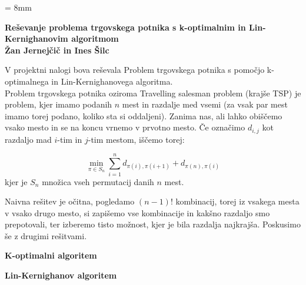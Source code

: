 \documentclass[a4paper,12pt]{article}
\begin{document}
\parindent = 8mm
\begin{center}
\textbf{Reševanje problema trgovskega potnika s k-optimalnim in Lin-Kernighanovim algoritmom}\\
\vspace{5 mm}
\textbf{Žan Jernejčič in Ines Šilc}
\end{center}

V projektni nalogi bova reševala Problem trgovskega potnika s pomočjo k-optimalnega in Lin-Kernighanovega algoritma.\\

Problem trgovskega potnika oziroma Travelling salesman problem (krajše TSP) je problem, kjer imamo podanih $n$ mest in razdalje med vsemi (za vsak par mest imamo torej podano, koliko sta si oddaljeni). Zanima nas, ali lahko obiščemo vsako mesto in se na koncu vrnemo v prvotno mesto. Če označimo $d_{i, j}$ kot razdaljo mad $i$-tim in $j$-tim mestom, iščemo torej:

$$
\min_{\pi \in S_n} \sum\limits_{i=1}^n d_{\pi (i), \pi (i+1)} + d_{\pi (n), \pi (i)}
$$
 kjer je $S_n$ množica vseh permutacij danih $n$ mest.
 
Naivna rešitev je očitna, pogledamo $(n-1)!$ kombinacij, torej iz vsakega mesta v vsako drugo mesto, si zapišemo vse kombinacije in kakšno razdaljo smo prepotovali, ter izberemo tisto možnost, kjer je bila razdalja najkrajša. Poskusimo še z drugimi rešitvami.

\vspace{5 mm}
\textbf{K-optimalni algoritem}




\vspace{5 mm}
\textbf{Lin-Kernighanov algoritem}
\end{document}
